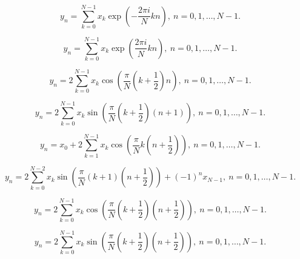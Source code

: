 \documentclass[12pt,a4paper]{article}
\begin{document}
$$
y_n = \sum_{k=0}^{N-1}x_k\exp(-\frac{2\pi i}{N}kn),
\ n=0,1,\dots,N\!\!-\!\!1.
$$
\newpage

$$
y_n = \sum_{k=0}^{N-1}x_k\exp(\frac{2\pi i}{N}kn),
\ n=0,1,\dots,N\!\!-\!\!1.
$$
\newpage

$$
y_n = 2\sum_{k=0}^{N-1}x_k\cos(\frac{\pi}{N}(k+\frac{1}{2})n),
\ n=0,1,\dots,N\!\!-\!\!1.
$$
\newpage

$$
y_n = 2\sum_{k=0}^{N-1}x_k\sin(\frac{\pi}{N}(k+\frac{1}{2})(n+1)),
\ n=0,1,\dots,N\!\!-\!\!1.
$$
\newpage

$$
y_n = x_0 + 2\sum_{k=1}^{N-1}x_k\cos(\frac{\pi}{N}k(n+\frac{1}{2})),
\ n=0,1,\dots,N\!\!-\!\!1.
$$
\newpage

$$
y_n = 2\sum_{k=0}^{N-2}x_k\sin(\frac{\pi}{N}(k+1)(n+\frac{1}{2}))+(-1)^{n}x_{N-1},
\ n=0,1,\dots,N\!\!-\!\!1.
$$
\newpage

$$
y_n = 2\sum_{k=0}^{N-1}x_k\cos(\frac{\pi}{N}(k+\frac{1}{2})(n+\frac{1}{2})),
\ n=0,1,\dots,N\!\!-\!\!1.
$$
\newpage

$$
y_n = 2\sum_{k=0}^{N-1}x_k\sin(\frac{\pi}{N}(k+\frac{1}{2})(n+\frac{1}{2})),
\ n=0,1,\dots,N\!\!-\!\!1.
$$
\end{document}
